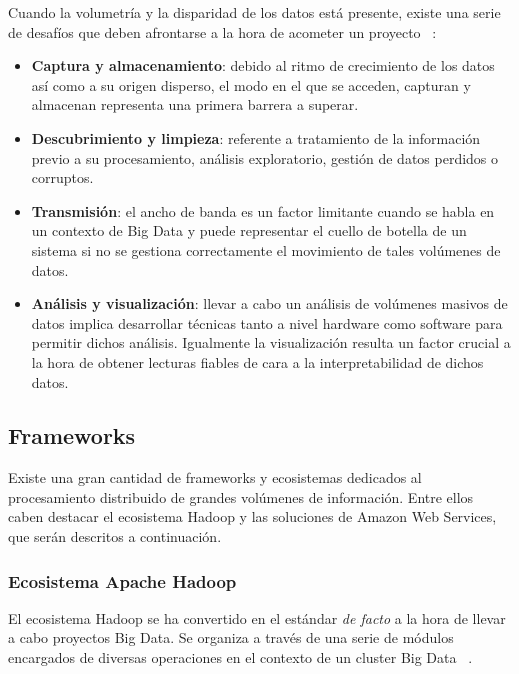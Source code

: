 Cuando la volumetría y la disparidad de los datos está presente, existe una
serie de desafíos que deben afrontarse a la hora de acometer un proyecto ~\cite{DBLP:journals/isci/ChenZ14a}:

\begin{itemize}
\item \textbf{Captura y almacenamiento}: debido al ritmo de crecimiento de los
  datos así como a su origen disperso, el modo en el que se acceden, capturan y
  almacenan representa una primera barrera a superar. 
\item \textbf{Descubrimiento y limpieza}: referente a tratamiento de la información previo a
  su procesamiento, análisis exploratorio, gestión de datos perdidos o
  corruptos. 
\item \textbf{Transmisión}: el ancho de banda es un factor limitante cuando se
  habla en un contexto de Big Data y puede representar el cuello de botella de
  un sistema si no se gestiona correctamente el movimiento de tales volúmenes de
  datos.
  
\item \textbf{Análisis y visualización}: llevar a cabo un análisis de volúmenes
  masivos de datos implica desarrollar técnicas tanto a nivel hardware como
  software para permitir dichos análisis. Igualmente la visualización resulta un
  factor crucial a la hora de obtener lecturas fiables de cara a la
  interpretabilidad de dichos datos.
  
\end{itemize}


\subsection{Frameworks}

Existe una gran cantidad de frameworks y ecosistemas dedicados al procesamiento
distribuido de grandes volúmenes de información. Entre ellos caben destacar el
ecosistema Hadoop y las soluciones de Amazon Web Services, que serán descritos a
continuación.


\subsubsection{Ecosistema Apache Hadoop}
\label{sec:eco-hadoop}

El ecosistema Hadoop se ha convertido en el estándar \textit{de facto} a la hora
de llevar a cabo proyectos Big Data. Se organiza a través de una serie de
módulos encargados de diversas operaciones en el contexto de un cluster Big
Data ~\cite{HADOOP-ecosystem}.

